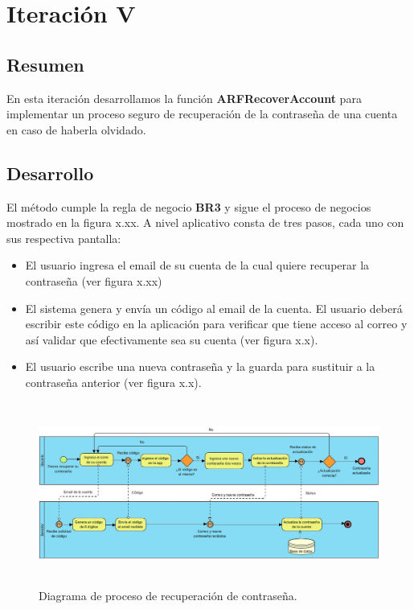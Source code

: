 \section{Iteración V}
\subsection{Resumen}
En esta iteración desarrollamos la función \textbf{ARFRecoverAccount} para implementar un proceso seguro de recuperación de la contraseña de una cuenta en caso de haberla olvidado.

\subsection{Desarrollo}
El método cumple la regla de negocio \textbf{BR3} y sigue el proceso de negocios mostrado en la figura x.xx. A nivel aplicativo consta de tres pasos, cada uno con sus respectiva pantalla:
\begin{itemize}
	\item El usuario ingresa el email de su cuenta de la cual quiere recuperar la contraseña (ver figura x.xx)
	\item El sistema genera y envía un código al email de la cuenta. El usuario deberá escribir este código en la aplicación para verificar que tiene acceso al correo y así validar que efectivamente sea su cuenta (ver figura x.x).
	\item El usuario escribe una nueva contraseña y la guarda para sustituir a la contraseña anterior (ver figura x.x).
\end{itemize}
\begin{figure}[h!]
	\centering
	\includegraphics[width=15cm,height=6cm]{imagenes/desarrollo/diagramas/BPMN_RECOVER.jpg}
	\caption{Diagrama de proceso de recuperación de contraseña.}
	\label{fig:recover}
\end{figure}
